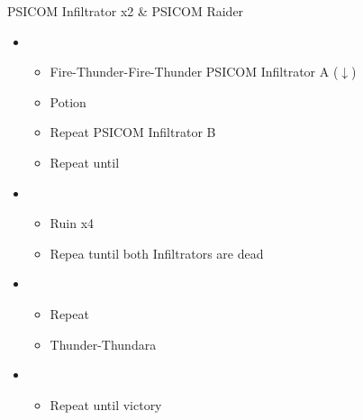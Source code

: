 \begin{battle}{PSICOM Infiltrator x2 \& PSICOM Raider}
\begin{itemize}
    \item \fourth
    \begin{itemize}
        \item Fire-Thunder-Fire-Thunder PSICOM Infiltrator A ($\downarrow$)
        \item Potion
        \item Repeat PSICOM Infiltrator B
        \item Repeat until \stagger
    \end{itemize}
    \item \fifth
    \begin{itemize}
        \item Ruin x4
        \item Repea tuntil both Infiltrators are dead
    \end{itemize}
    \item \fourth
    \begin{itemize}
        \item Repeat
        \item Thunder-Thundara
        \stagger
    \end{itemize}
    \item \fifth
    \begin{itemize}
        \item Repeat until victory
    \end{itemize}
\end{itemize}
 
\end{battle}





